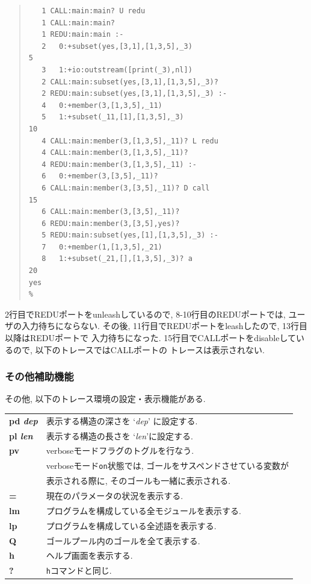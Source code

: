 \documentclass[a4,titlepage]{jsreport}
\begin{document}
\begin{quote}%
\begin{Verbatim}[frame=single,baselinestretch=0.8]
% subset -t                                                            1
   1 CALL:main:main? U redu
   1 CALL:main:main? 
   1 REDU:main:main :-
   2   0:+subset(yes,[3,1],[1,3,5],_3)                                 5
   3   1:+io:outstream([print(_3),nl])
   2 CALL:main:subset(yes,[3,1],[1,3,5],_3)? 
   2 REDU:main:subset(yes,[3,1],[1,3,5],_3) :-
   4   0:+member(3,[1,3,5],_11)
   5   1:+subset(_11,[1],[1,3,5],_3)                                  10
   4 CALL:main:member(3,[1,3,5],_11)? L redu
   4 CALL:main:member(3,[1,3,5],_11)? 
   4 REDU:main:member(3,[1,3,5],_11) :-
   6   0:+member(3,[3,5],_11)? 
   6 CALL:main:member(3,[3,5],_11)? D call                            15
   6 CALL:main:member(3,[3,5],_11)? 
   6 REDU:main:member(3,[3,5],yes)? 
   5 REDU:main:subset(yes,[1],[1,3,5],_3) :-
   7   0:+member(1,[1,3,5],_21)
   8   1:+subset(_21,[],[1,3,5],_3)? a                                20
yes
%
\end{Verbatim}
\end{quote}

2行目でREDUポートをunleashしているので, 8-10行目のREDUポートでは, 
ユーザの入力待ちにならない.  
その後, 11行目でREDUポートをleashしたので, 13行目以降はREDUポートで
入力待ちになった.  
15行目でCALLポートをdisableしているので, 以下のトレースではCALLポートの
トレースは表示されない.  

\subsubsection{その他補助機能}

その他, 以下のトレース環境の設定・表示機能がある.  

\vspace{5mm}
\begin{tabular}{ll}
{\bf pd \it dep}&  表示する構造の深さを `{\it dep}' に設定する.   \\
{\bf pl \it len}&  表示する構造の長さを `{\it len}'に設定する.   \\
{\bf pv}&  verboseモードフラグのトグルを行なう.  \\
	&   verboseモード{\tt on}状態では, ゴールをサスペンドさせている変数が\\
	& 表示される際に, そのゴールも一緒に表示される.  \\
{\bf =}	&  現在のパラメータの状況を表示する.  		\\
{\bf lm}&   プログラムを構成している全モジュールを表示する.  		\\
{\bf lp}&	プログラムを構成している全述語を表示する.  		\\
{\bf Q} & ゴールプール内のゴールを全て表示する.  \\
{\bf h} &	  ヘルプ画面を表示する.  			\\
{\bf ?} &	  {\tt h}コマンドと同じ.  			\\
\end{tabular}
\vspace{5mm}
\end{document}
